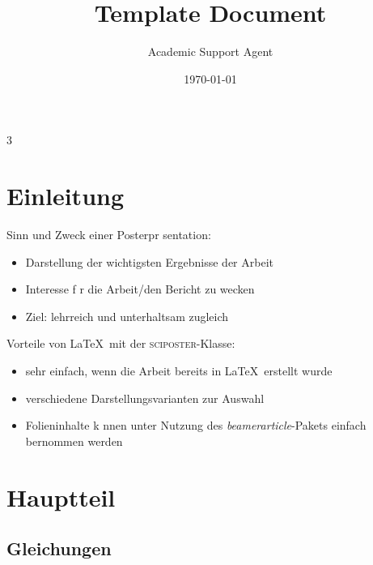 \documentclass{article}
\title{Template Document}
\author{Academic Support Agent}
\date{\today}
\begin{document}
\maketitle


\maketitle\vspace{-1em}

\begin{multicols}{3}

\section{Einleitung}

\begin{block}{Sinn und Zweck einer Posterpr sentation:}
	\begin{itemize}
		\item Darstellung der wichtigsten Ergebnisse der Arbeit
		\item Interesse f r die Arbeit/den Bericht zu wecken
		\item Ziel: lehrreich und unterhaltsam zugleich
	\end{itemize}
\end{block}

\begin{block}{Vorteile von \LaTeX\ mit der \textsc{sciposter}-Klasse:}
	\begin{itemize}
		\item sehr einfach, wenn die Arbeit bereits in \LaTeX\ erstellt wurde
		\item verschiedene Darstellungsvarianten zur Auswahl
		\item Folieninhalte k nnen unter Nutzung des \emph{beamerarticle}-Pakets einfach  bernommen werden
	\end{itemize}
\end{block}

\section{Hauptteil}

\subsection{Gleichungen}


\end{multicols}
\end{document}
